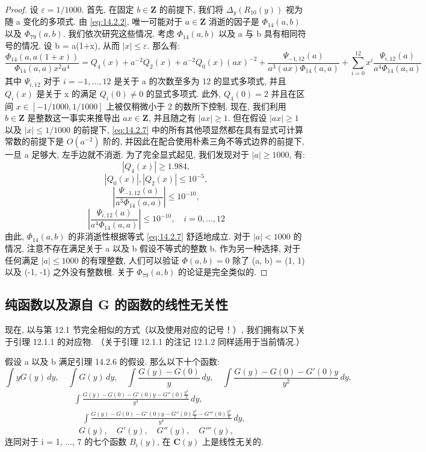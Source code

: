 \begin{proof}
设 \(\varepsilon = 1/1000\). 
首先, 在固定 \(b \in \mathbf{Z}\) 的前提下, 我们将 \(\Delta_y(R_{10}(y))\) 视为随 a 变化的多项式. 
由 \eqref{eq:14.2.2}, 唯一可能对于 \(a \in \mathbf{Z}\) 消逝的因子是 \(\Phi_{14}(a,b)\) 以及 \(\Phi_{79}(a,b)\). 
我们依次研究这些情况. 
考虑 \(\Phi_{14}(a,b)\) 以及 a 与 b 具有相同符号的情况. 
设 b = a(1+x), 从而 \(|x| \leq \varepsilon\). 那么有:
\begin{equation}\label{eq:14.2.7}
\frac{\Phi_{14}(a, a(1+x))}{\Phi_{14}(a, a)x^{2}a^{4}} = Q_{4}(x) + a^{-2}Q_{2}(x) + a^{-2}Q_{0}(x)(ax)^{-2} + \frac{\Psi_{-1,12}(a)}{a^{3}(ax)\Phi_{14}(a, a)} + \sum_{i=0}^{12} x^{i} \frac{\Psi_{i,12}(a)}{a^{4}\Phi_{14}(a, a)}
\end{equation}
其中 \(\Psi_{i,12}\) 对于 \(i=-1,\ldots,12\) 
是关于 a 的次数至多为 12 的显式多项式, 
并且 \(Q_i(x)\) 是关于 x 的满足 \(Q_i(0) \neq 0\) 的显式多项式. 
此外, \(Q_4(0) = 2\) 并且在区间 \(x \in [-1/1000, 1/1000]\) 上被仅稍微小于 2 的数所下控制. 
现在, 我们利用 \(b \in \mathbf{Z}\) 是整数这一事实来推导出 \(ax \in \mathbf{Z}\), 
并且随之有 \(|ax| \geq 1\). 
但在假设 \(|ax| \geq 1\) 以及 \(|x| \leq 1/1000\) 的前提下, 
\eqref{eq:14.2.7} 中的所有其他项显然都在具有显式可计算常数的前提下是 \(O(a^{-2})\) 阶的, 
并因此在配合使用朴素三角不等式边界的前提下, 
一旦 a 足够大, 左手边就不消逝. 
为了完全显式起见, 我们发现对于 \(|a| \geq 1000\), 有:
\[ |Q_4(x)| \ge 1.984, \]
\[ |Q_0(x)|, |Q_2(x)| \le 10^{-5}, \]
\[ \left|\frac{\Psi_{-1,12}(a)}{a^3\Phi_{14}(a,a)}\right| \le 10^{-10}, \]
\[ \left|\frac{\Psi_{i,12}(a)}{a^4\Phi_{14}(a,a)}\right| \le 10^{-10}, \quad i = 0, \dots, 12 \]
由此, \(\Phi_{14}(a, b)\) 的非消逝性根据等式 \eqref{eq:14.2.7} 舒适地成立. 
对于 \(|a| < 1000\) 的情况, 注意不存在满足关于 a 以及 b 假设不等式的整数 b. 
作为另一种选择, 对于任何满足 \(|a| \le 1000\) 的有理整数, 
人们可以验证 \(\Phi(a, b) = 0\) 除了 (a, b) = (1, 1) 以及 (-1, -1) 之外没有整数根. 
关于 \(\Phi_{79}(a,b)\) 的论证是完全类似的.
\end{proof}

\subsection{纯函数以及源自 G 的函数的线性无关性}\label{sec:14.3}

现在, 以与第 12.1 节完全相似的方式（以及使用对应的记号！）, 
我们拥有以下关于引理 12.1.1 的对应物. 
（关于引理 12.1.1 的注记 12.1.2 同样适用于当前情况.）

\begin{lemma}\label{lem:14.3.1}
假设 a 以及 b 满足引理 14.2.6 的假设. 
那么以下十个函数:
\[ \int yG(y) \, dy, \quad \int G(y) \, dy, \quad \int \frac{G(y) - G(0)}{y} \, dy, \quad \int \frac{G(y) - G(0) - G'(0)y}{y^2} \, dy, \]
\[
\begin{aligned}
&\int \frac{G(y) - G(0) - G'(0)y - G''(0)\frac{y^2}{2}}{y^3} \, dy, \\
&\quad \int \frac{G(y) - G(0) - G'(0)y - G''(0)\frac{y^2}{2} - G'''(0)\frac{y^3}{6}}{y^4} \, dy,
\end{aligned}
\]
\[ G(y), \quad G'(y), \quad G''(y), \quad G'''(y), \]
连同对于 i = 1, ..., 7 的七个函数 \(B_i(y)\), 
在 \(\mathbf{C}(y)\) 上是线性无关的.
\end{lemma}

